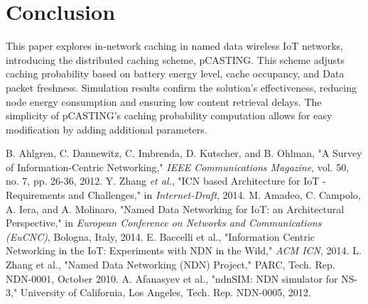 \documentclass[conference]{IEEEtran}
\begin{document}
\section{Conclusion}

This paper explores in-network caching in named data wireless IoT networks, introducing the distributed caching scheme, pCASTING. 
This scheme adjusts caching probability based on battery energy level, cache occupancy, and Data packet freshness. Simulation results 
confirm the solution's effectiveness, reducing node energy consumption and ensuring low content retrieval delays. The simplicity of pCASTING's 
caching probability computation allows for easy modification by adding additional parameters.

\begin{thebibliography}{00}
 B. Ahlgren, C. Dannewitz, C. Imbrenda, D. Kutscher, and B. Ohlman, "A Survey of Information-Centric Networking," \textit{IEEE Communications Magazine}, vol. 50, no. 7, pp. 26-36, 2012.
 Y. Zhang \textit{et al.}, "ICN based Architecture for IoT - Requirements and Challenges," in \textit{Internet-Draft}, 2014.
 M. Amadeo, C. Campolo, A. Iera, and A. Molinaro, "Named Data Networking for IoT: an Architectural Perspective," in \textit{European Conference on Networks and Communications (EuCNC)}, Bologna, Italy, 2014.
 E. Baccelli et al., "Information Centric Networking in the IoT: Experiments with NDN in the Wild," \textit{ACM ICN}, 2014.
 L. Zhang et al., "Named Data Networking (NDN) Project," PARC, Tech. Rep. NDN-0001, October 2010.
 A. Afanasyev et al., "ndnSIM: NDN simulator for NS-3," University of California, Los Angeles, Tech. Rep. NDN-0005, 2012.

\end{thebibliography}
\end{document}
